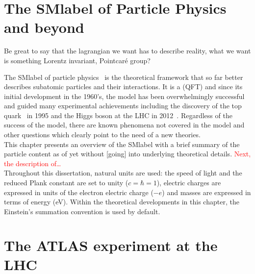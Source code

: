 \chapter{The \acrlong{SMlabel} of Particle Physics and beyond}

Be great to say that the lagrangian we want has to describe reality, what we want is something Lorentz invariant, Pointcaré group?

The \acrfull{SMlabel} of particle physics~\cite{PhysRevLett.19.1264,GLASHOW1961579,RevModPhys.52.525} is the theoretical framework
that so far better describes subatomic particles and their interactions.
It is a  (\acrshort{QFT}) and since its initial development in the 1960's,
the model has been overwhelmingly successful and guided many experimental achievements
including the discovery of the top quark~\cite{topsearch1995,PhysRevLett.74.2626} in 1995
and the Higgs boson at the LHC in 2012~\cite{ATLASHiggs2012,CMShiggs2012}.
Regardless of the success of the model, there are known phenomena not covered in the model
and other questions which clearly point to the need of a new theories.\\
This chapter presents an overview of the \acrshort{SMlabel} with a brief summary of the particle content as of yet without
[going] into underlying theoretical details. \textcolor{red}{Next, the description of\ldots}\\

Throughout this dissertation, natural units are used: the speed of light and the reduced Plank constant are set to unity ($c=\hbar=1$),
electric charges are expressed in units of the electron electric charge ($-e$) and masses are expressed in terms of energy (eV).
Within the theoretical developments in this chapter, the Einstein's summation convention is used by default. 



\chapter{The ATLAS experiment at the LHC}


